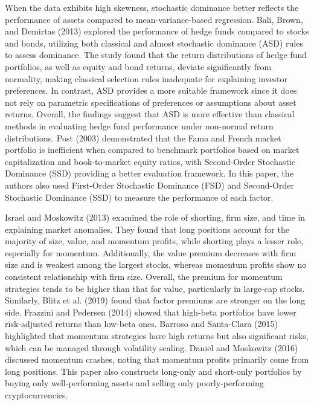 \documentclass{article}
\begin{document}
When the data exhibits high skewness, stochastic dominance better reflects the performance of assets compared to mean-variance-based regression. Bali, Brown, and Demirtas (2013) explored the performance of hedge funds compared to stocks and bonds, utilizing both classical and almost stochastic dominance (ASD) rules to assess dominance. The study found that the return distributions of hedge fund portfolios, as well as equity and bond returns, deviate significantly from normality, making classical selection rules inadequate for explaining investor preferences. In contrast, ASD provides a more suitable framework since it does not rely on parametric specifications of preferences or assumptions about asset returns. Overall, the findings suggest that ASD is more effective than classical methods in evaluating hedge fund performance under non-normal return distributions. Post (2003) demonstrated that the Fama and French market portfolio is inefficient when compared to benchmark portfolios based on market capitalization and book-to-market equity ratios, with Second-Order Stochastic Dominance (SSD) providing a better evaluation framework. In this paper, the authors also used First-Order Stochastic Dominance (FSD) and Second-Order Stochastic Dominance (SSD) to measure the performance of each factor.

Israel and Moskowitz (2013) examined the role of shorting, firm size, and time in explaining market anomalies. They found that long positions account for the majority of size, value, and momentum profits, while shorting plays a lesser role, especially for momentum. Additionally, the value premium decreases with firm size and is weakest among the largest stocks, whereas momentum profits show no consistent relationship with firm size. Overall, the premium for momentum strategies tends to be higher than that for value, particularly in large-cap stocks. Similarly, Blitz et al. (2019) found that factor premiums are stronger on the long side. Frazzini and Pedersen (2014) showed that high-beta portfolios have lower risk-adjusted returns than low-beta ones. Barroso and Santa-Clara (2015) highlighted that momentum strategies have high returns but also significant risks, which can be managed through volatility scaling. Daniel and Moskowitz (2016) discussed momentum crashes, noting that momentum profits primarily come from long positions. This paper also constructs long-only and short-only portfolios by buying only well-performing assets and selling only poorly-performing cryptocurrencies.
\end{document}
